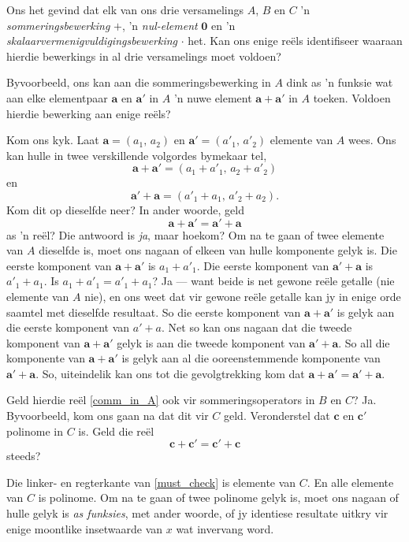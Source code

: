 \documentclass[a4paper,11pt]{book}
\theoremstyle{definition}
\newcommand{\be}{\begin{equation}}
\newcommand{\ee}{\end{equation}}
\newcommand{\ve}[1]{\mathbf{#1}}
\begin{document}
Ons het gevind dat elk van ons drie versamelings $A$, $B$ en $C$ 'n
\emph{sommeringsbewerking} $+$, 'n \emph{nul-element} $\ve{0}$ en 'n
\emph{skalaarvermenigvuldigingsbewerking} $\cdot$ het. Kan ons enige
re{\"e}ls
identifiseer waaraan hierdie bewerkings in al drie versamelings moet
voldoen?

Byvoorbeeld, ons kan aan die sommeringsbewerking in $A$ dink as 'n funksie
wat aan elke elementpaar $\ve{a}$ en $\ve{a}'$ in $A$ 'n nuwe element
$\ve{a} + \ve{a}'$ in $A$ toeken. Voldoen hierdie bewerking aan enige
re{\"e}ls?

Kom ons kyk.  Laat $\ve{a} = (a_1, \,a_2)$ en $\ve{a}' = (a'_1, \, a'_2)$
elemente van $A$ wees.  Ons kan hulle in twee verskillende volgordes
bymekaar tel,
\[
	\ve{a} + \ve{a}' = (a_1 + a'_1, \, a_2 + a'_2)
\]
en
\[
	\ve{a}' + \ve{a} = (a'_1 + a_1, \, a'_2 + a_2).
\]
Kom dit op dieselfde neer? In ander woorde, geld
\be \label{comm_in_A}
\ve{a} + \ve{a}' = \ve{a}' + \ve{a}
\ee
as 'n re{\"e}l? Die antwoord is \emph{ja}, maar hoekom?  Om na te gaan of
twee elemente van $A$ dieselfde is, moet ons nagaan of elkeen van hulle
komponente gelyk is.  Die eerste komponent van $\ve{a} + \ve{a}'$ is $a_1 +
a'_1$.  Die eerste komponent van $\ve{a}' + \ve{a}$ is $a'_1 + a_1$. Is
$a_1 + a'_1 = a'_1 + a_1$? Ja --- want beide is net gewone re{\"e}le
getalle (nie elemente van $A$ nie), en ons weet dat vir gewone re{\"e}le
getalle kan jy in enige orde saamtel met dieselfde resultaat.  So die
eerste komponent van $\ve{a} + \ve{a}'$ is gelyk aan die eerste komponent
van $a' + a$.  Net so kan ons nagaan dat die tweede komponent van $\ve{a} +
\ve{a}'$ gelyk is aan die tweede komponent van $\ve{a}' + \ve{a}$. So all
die komponente van $\ve{a} + \ve{a}'$ is gelyk aan al die ooreenstemmende
komponente van $\ve{a}' + \ve{a}$. So, uiteindelik kan ons tot die
gevolgtrekking kom dat $\ve{a} + \ve{a}' = \ve{a}' + \ve{a}$.

Geld hierdie re{\"e}l \eqref{comm_in_A} ook vir sommeringsoperators in $B$
en $C$? Ja. Byvoorbeeld, kom ons gaan na dat dit vir $C$ geld.
Veronderstel dat $\ve{c}$ en $\ve{c}'$ polinome in $C$ is.  Geld die
re{\"e}l
\be
\ve{c} + \ve{c}' = \ve{c}' + \ve{c} \label{must_check}
\ee
steeds?

Die linker- en regterkante van \eqref{must_check} is elemente van $C$.  En
alle elemente van $C$ is polinome.  Om na te gaan of twee polinome gelyk
is, moet ons nagaan of hulle gelyk is \emph{as funksies}, met ander woorde,
of jy identiese resultate uitkry vir enige moontlike insetwaarde van $x$
wat invervang word.
\end{document}
